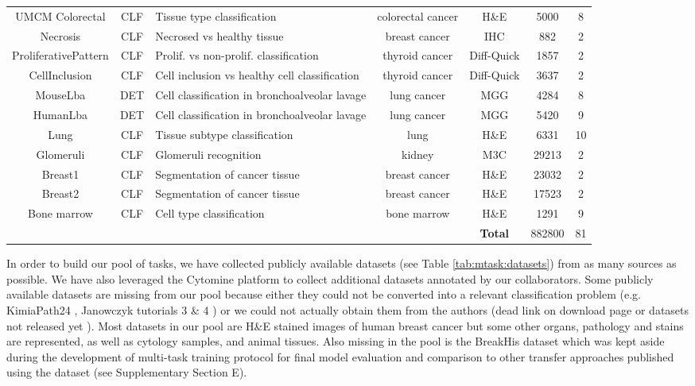 \begin{table*}[t]
\begin{tabular}{|c|c|l|c|c|c|c|}
UMCM Colorectal \cite{kather2016multi}  & CLF & Tissue type classification & colorectal cancer & H\&E& 5000 & 8 \\
Necrosis \cite{mormont2018comparison}  & CLF &  Necrosed vs healthy tissue & breast cancer & IHC & 882 & 2 \\
ProliferativePattern \cite{mormont2018comparison}  & CLF &  Prolif. vs non-prolif. classification & thyroid cancer & Diff-Quick & 1857 & 2 \\
CellInclusion \cite{mormont2018comparison}  & CLF &  Cell inclusion vs healthy cell classification & thyroid cancer & Diff-Quick & 3637 & 2 \\
MouseLba \cite{mormont2018comparison}  & DET &  Cell classification in bronchoalveolar lavage & lung cancer & MGG & 4284 & 8 \\
HumanLba \cite{mormont2018comparison}  & DET &  Cell classification in bronchoalveolar lavage & lung cancer & MGG & 5420 & 9 \\
Lung \cite{mormont2018comparison}  & CLF &  Tissue subtype classification & lung & H\&E & 6331 & 10 \\
Glomeruli \cite{maree2016approach}  & CLF &  Glomeruli recognition & kidney & M3C & 29213 & 2 \\
Breast1 \cite{mormont2018comparison}  & CLF & Segmentation of cancer tissue & breast cancer & H\&E & 23032 & 2 \\
Breast2 \cite{mormont2018comparison}  & CLF & Segmentation of cancer tissue & breast cancer & H\&E & 17523 & 2 \\
Bone marrow \cite{kainz2017training} & CLF & Cell type classification & bone marrow & H\&E & 1291 & 9 \\
        \hline 
\multicolumn{4}{|c|}{} & \textbf{Total} & 882800 & 81 \\
\hline
    \end{tabular}
\end{table*}

In order to build our pool of tasks, we have collected publicly available datasets (see Table \ref{tab:mtask:datasets}) from as many sources as possible. We have also leveraged the Cytomine \cite{maree2016collaborative} platform to collect additional datasets annotated by our collaborators. Some publicly available datasets are missing from our pool because either they could not be converted into a relevant classification problem (e.g. KimiaPath24  \cite{babaie2017classification}, Janowczyk tutorials 3 \& 4 \cite{janowczyk2016deep}) or we could not actually obtain them from the authors (dead link on download page or datasets not released yet \cite{gamper2019pannuke}). Most datasets in our pool are H\&E stained images of human breast cancer but some other organs, pathology and stains are represented, as well as cytology samples, and animal tissues. Also missing in the pool is the BreakHis \cite{spanhol2015dataset} dataset which was kept aside during the development of multi-task training protocol for final model evaluation and comparison to other transfer approaches published using the dataset (see Supplementary Section E). 

